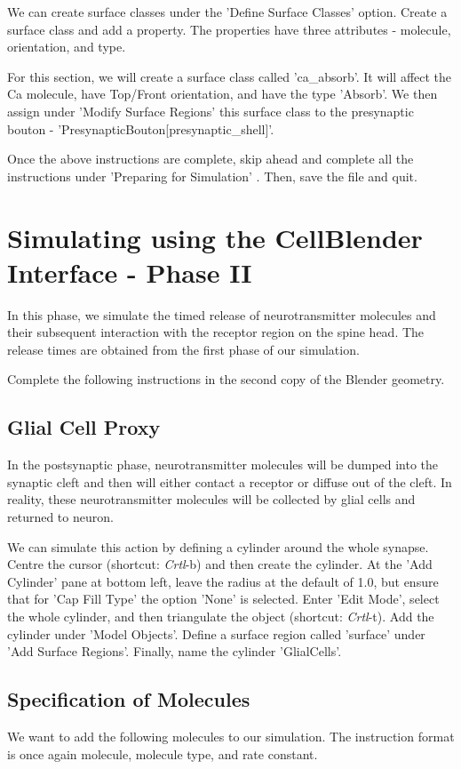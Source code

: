\documentclass[twoside,a4paper]{refart}
\begin{document}
We can create surface classes under the 'Define Surface Classes' option. Create a surface class and add a property. The properties have three attributes - molecule, orientation, and type. 

For this section, we will create a surface class called 'ca\_absorb'. It will affect the Ca molecule, have Top/Front orientation, and have the type 'Absorb'. We then assign under 'Modify Surface Regions' this surface class to the presynaptic bouton - 'PresynapticBouton[presynaptic\_shell]'.
 
Once the above instructions are complete, skip ahead and complete all the instructions under 'Preparing for Simulation' . Then, save the file and quit.

\section{Simulating using the CellBlender Interface - Phase II}
In this phase, we simulate the timed release of neurotransmitter molecules and their subsequent interaction with the receptor region on the spine head. The release times are obtained from the first phase of our simulation.

Complete the following instructions in the second copy of the Blender geometry.
\subsection{Glial Cell Proxy}
In the postsynaptic phase, neurotransmitter molecules will be dumped into the synaptic cleft and then will either contact a receptor or diffuse out of the cleft. In reality, these neurotransmitter molecules will be collected by glial cells and returned to neuron.

We can simulate this action by defining a cylinder around the whole synapse. Centre the cursor (shortcut: \textit{Crtl}-b) and then create the cylinder. At the 'Add Cylinder' pane at bottom left, leave the radius at the default of 1.0, but ensure that for 'Cap Fill Type' the option 'None' is selected. Enter 'Edit Mode', select the whole cylinder, and then triangulate the object (shortcut: \textit{Crtl}-t). Add the cylinder under 'Model Objects'. Define a surface region called 'surface' under 'Add Surface Regions'. Finally, name the cylinder 'GlialCells'. 


\subsection{Specification of Molecules}
We want to add the following molecules to our simulation. The instruction format is once again molecule, molecule type, and rate constant.
\end{document}
